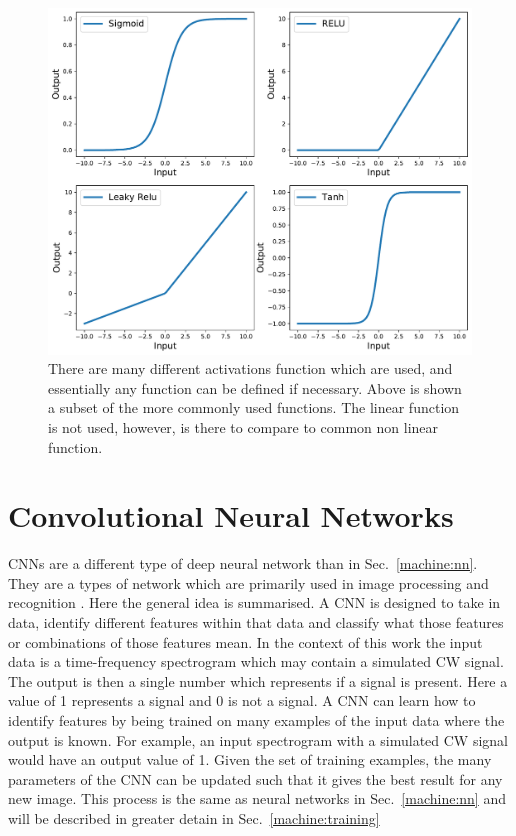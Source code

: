 \begin{figure}[h]
	\centering
	\includegraphics[width=0.8\columnwidth]{C4_cnn/activations.pdf}
	\caption{There are many different activations function which are used, and essentially any function can be defined if necessary. Above is shown a subset of the more commonly used functions. The linear function is not used, however, is there to compare to common non linear function.}
	\label{machine:nn:activation:plot}
\end{figure}





\section{\label{machine:cnn}Convolutional Neural Networks}

\acp{CNN} are a different type of deep neural network than in Sec.~\ref{machine:nn}.
They are a types of network which are primarily used in image
processing and recognition
\cite{lecun2015DeepLearning,lecun1998GradientbasedLearning,waibel1989PhonemeRecognition,krizhevsky2012ImageNetClassificationa}.
Here the general idea is summarised. 
A \ac{CNN} is designed to take in data, identify different features within that data and classify
what those features or combinations of those features mean.
In the context of this work the input data is a time-frequency spectrogram which may contain a simulated \ac{CW} signal.
The output is then a single number which represents if a signal is present.
Here a value of 1 represents a signal and 0 is not a signal.
A \ac{CNN} can learn how to identify features by being trained on many
examples of the input data where the output is known.
For example, an input spectrogram with a simulated \ac{CW} signal would have an output value of 1.
Given the set of training examples, the many parameters of the \ac{CNN} can
be updated such that it gives the best result for any new image. 
This process is the same as neural networks in Sec.~\ref{machine:nn} and will be described in greater detain in Sec.~\ref{machine:training}

